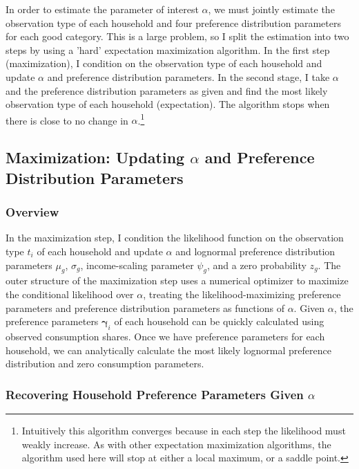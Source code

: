 \documentclass[11pt]{article}
\begin{document}
\begin{CJK}{UTF8}{gbsn}
In order to estimate the parameter of interest $\alpha$, we must jointly estimate the observation type of each household and four preference distribution parameters for each good category.  This is a large problem, so I split the estimation into two steps by using a 'hard' expectation maximization algorithm.  In the first step (maximization), I condition on the observation type of each household and update $\alpha$ and preference distribution parameters.  In the second stage, I take $\alpha$ and the preference distribution parameters as given and find the most likely observation type of each household (expectation).  The algorithm stops when there is close to no change in $\alpha$.\footnote{Intuitively this algorithm converges because in each step the likelihood must weakly increase.  As with other expectation maximization algorithms, the algorithm used here will stop at either a local maximum, or a saddle point.} 

\subsection{Maximization: Updating $\alpha$ and Preference Distribution Parameters} 

\subsubsection{Overview}
In the maximization step, I condition the likelihood function on the observation type $t_i$ of each household and update $\alpha$ and lognormal preference distribution parameters $\mu_g$, $\sigma_g$, income-scaling parameter $\psi_g$, and a zero probability $z_g$.  The outer structure of the maximization step uses a numerical optimizer to maximize the conditional likelihood over $\alpha$, treating the likelihood-maximizing preference parameters and preference distribution parameters as functions of $\alpha$.  Given $\alpha$, the preference parameters $\boldsymbol{\gamma}_i$ of each household can be quickly calculated using observed consumption shares.  Once we have preference parameters for each household, we can analytically calculate the most likely lognormal preference distribution and zero consumption parameters.

\subsubsection{Recovering Household Preference Parameters Given $\alpha$}
\label{sec:upd_prefs}


\end{CJK}
\end{document}
